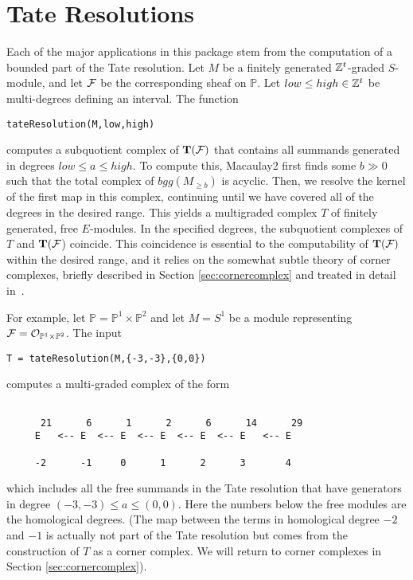 \documentclass[twoside,12pt, leqno]{amsart}
\def\PP{{\mathbb P}}
\def\bT{{\bf T}}
\begin{document}
\section{Tate Resolutions}\label{sec:tate resolutions}
Each of the major applications in this package stem from the computation of a bounded part of the Tate resolution.
Let $M$ be a finitely generated ${\mathbb Z}^t$-graded $S$-module, and let ${\mathcal F}$ be the 
corresponding sheaf on $\PP$. Let
$low\leq high\in {\mathbb Z}^t$ be multi-degrees defining an interval.  The function
\begin{verbatim}
tateResolution(M,low,high)
\end{verbatim}
computes a subquotient complex of $\bT(\sF)$ that contains all summands generated in degrees $low\leq a \leq  high$.  To compute this, Macaulay2 first finds some $b\gg 0$ such that the total complex of $bgg(M_{\geq b})$ is acyclic.  	Then, we resolve the kernel of  the first map in this complex, continuing until we have covered all of the degrees in the desired range.  This yields a multigraded complex $T$ of finitely generated, free $E$-modules.  In the specified degrees, the subquotient complexes of $T$ and $\bT(\sF$) coincide.  This coincidence is essential to the computability of $\bT(\sF)$ within the desired range, and it relies on the somewhat subtle theory of corner complexes, briefly described in Section \ref{sec:cornercomplex} and treated in detail in~\cite{EES}.

For example, let $\PP=\PP^1\times \PP^2$ and let $M=S^1$ be a module representing $\sF=\cO_{\PP^1\times \PP^2}$.  The input
\begin{verbatim}
T = tateResolution(M,{-3,-3},{0,0})
\end{verbatim}
computes a multi-graded complex of the form
{\small \begin{verbatim}

      21      6      1      2      6      14      29
     E   <-- E  <-- E  <-- E  <-- E  <-- E   <-- E
                                                      
     -2      -1     0      1      2      3       4
\end{verbatim}}
\noindent which includes all the free summands in the Tate resolution that have generators in degree $(-3,-3)\leq a\leq (0,0)$. Here the numbers below the free modules are the homological degrees. (The map between the terms in homological degree $-2$ and $-1$ is actually not part of the Tate resolution but  comes from the construction of $T$ as a corner complex. We will return to corner complexes in Section \ref{sec:cornercomplex}). 
\end{document}
